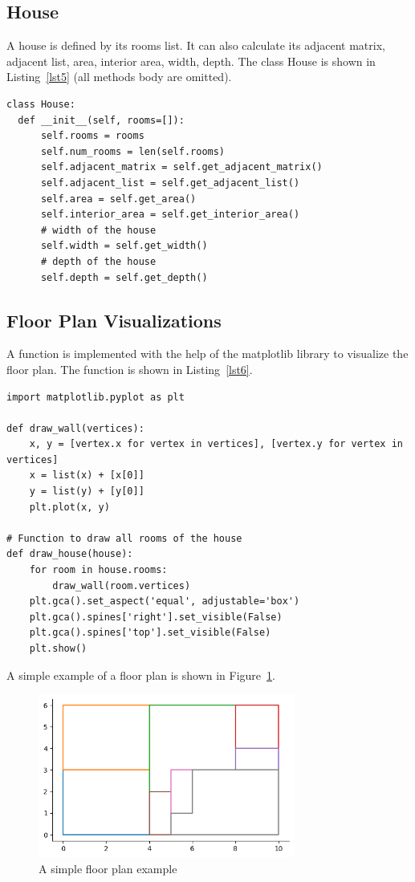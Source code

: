 \documentclass[]{article}
\begin{document}
\subsection{House}
A house is defined by its rooms list. It can also calculate its adjacent matrix, adjacent list, area, interior area, width, depth. The class House is shown in Listing~\ref{lst5} (all methods body are omitted).
\begin{lstlisting}[caption=House class, label=lst5]
class House:
  def __init__(self, rooms=[]):
      self.rooms = rooms
      self.num_rooms = len(self.rooms)
      self.adjacent_matrix = self.get_adjacent_matrix()
      self.adjacent_list = self.get_adjacent_list()
      self.area = self.get_area()
      self.interior_area = self.get_interior_area()
      # width of the house
      self.width = self.get_width()
      # depth of the house
      self.depth = self.get_depth()
\end{lstlisting}

\subsection{Floor Plan Visualizations}
A function is implemented with the help of the matplotlib library to visualize the floor plan. The function is shown in Listing~\ref{lst6}.
\begin{lstlisting}[caption=Visualize floor plan, label=lst6]
import matplotlib.pyplot as plt

def draw_wall(vertices):
    x, y = [vertex.x for vertex in vertices], [vertex.y for vertex in vertices]
    x = list(x) + [x[0]]
    y = list(y) + [y[0]]
    plt.plot(x, y)

# Function to draw all rooms of the house
def draw_house(house):
    for room in house.rooms:
        draw_wall(room.vertices)
    plt.gca().set_aspect('equal', adjustable='box')
    plt.gca().spines['right'].set_visible(False)
    plt.gca().spines['top'].set_visible(False)
    plt.show()
\end{lstlisting}
A simple example of a floor plan is shown in Figure~\ref{floor_plan}.
\begin{figure}[h]
  \centering
  \includegraphics[width=0.75\textwidth]{floor_plan.png}
  \caption{A simple floor plan example}\label{floor_plan}
\end{figure}
\end{document}
